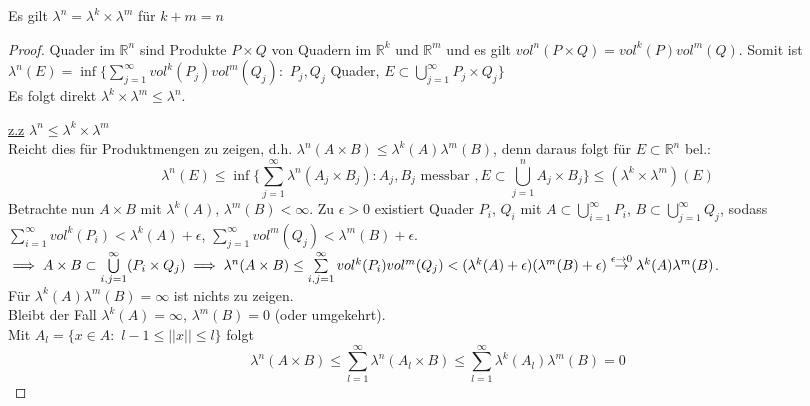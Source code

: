   \begin{lemma}
    Es gilt $\lambda^n = \lambda^k \times \lambda^m$ für $k + m = n$
  \end{lemma}

  \begin{proof}
    Quader im $\mathbb{R}^n$ sind Produkte $P\times Q$ von Quadern im $\mathbb{R}^k$ und $\mathbb{R}^m$ und es gilt $vol^n(P\times Q) = vol^k(P)vol^m(Q)$. Somit ist $\lambda^n(E) = \inf \{\sum\limits_{j=1}^\infty vol^k(P_j)vol^m(Q_j):$ $ P_j, Q_j$ Quader, $E\subset \bigcup\limits_{j=1}^\infty P_j\times Q_j \}$ \\
    Es folgt direkt $\lambda^k \times \lambda^m \leq \lambda^n$. \\
    \item[\underline{z.z}] $\lambda^n \leq \lambda^k\times\lambda^m$ \\
    Reicht dies für Produktmengen zu zeigen, d.h. $\lambda^n(A\times B) \leq \lambda^k(A) \lambda^m(B)$, denn daraus folgt für $E\subset \mathbb{R}^n$ bel.: 
    $$ \lambda^n(E) \leq \inf\{\sum\limits_{j=1}^\infty \lambda^n(A_j\times B_j): A_j, B_j \text{ messbar }, E\subset \bigcup\limits_{j=1}^n A_j\times B_j \} \leq (\lambda^k\times\lambda^m)(E)$$ 
    Betrachte nun $A\times B$ mit $\lambda^k(A)$, $\lambda^m(B) <\infty$. Zu $\epsilon >0$ existiert Quader $P_i$, $Q_i$ mit $A\subset \bigcup\limits_{i=1}^\infty P_i$, $B\subset \bigcup\limits_{j=1}^\infty Q_j$, sodass $\sum\limits_{i=1}^\infty vol^k(P_i) < \lambda^k(A)+\epsilon$, $\sum\limits_{j=1}^\infty vol^m(Q_j) < \lambda^m(B)+\epsilon$. \\
    $\implies A\times B \subset \bigcup\limits_{i,j=1}^\infty (P_i\times Q_j) \\
    \implies \lambda^n(A\times B) \leq \sum\limits_{i,j=1}^\infty vol^k(P_i) vol^m(Q_j) < (\lambda^k(A) + \epsilon) (\lambda^m(B) + \epsilon) \overset{\epsilon\to 0}{\to} \lambda^k(A)\lambda^m(B)$. \\
    Für $\lambda^k(A)\lambda^m(B) = \infty$ ist nichts zu zeigen. \\
    Bleibt der Fall $\lambda^k(A) = \infty$, $\lambda^m(B) = 0$ (oder umgekehrt).\\
    Mit $A_l = \{x\in A:$ $l-1\leq ||x|| \leq l \}$ folgt \\
    $$\lambda^n(A\times B) \leq \sum\limits_{l=1}^\infty \lambda^n(A_l\times B) \leq \sum\limits_{l=1}^\infty \lambda^k(A_l)\lambda^m(B) = 0$$
  \end{proof}
  \newpage 
  
